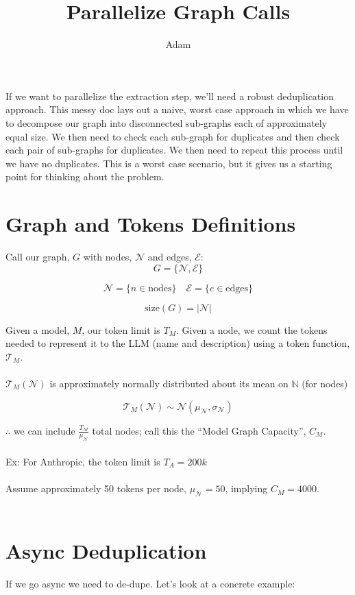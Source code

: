 \documentclass[11pt, oneside]{article}
\title{Parallelize Graph Calls}
\author{Adam}
\begin{document}
\maketitle
If we want to parallelize the extraction step, we'll need a robust deduplication approach. This messy doc lays out a naive, worst case approach in which we have to decompose our graph into disconnected sub-graphs each of approximately equal size. We then need to check each sub-graph for duplicates and then check each pair of sub-graphs for duplicates. We then need to repeat this process until we have no duplicates. This is a worst case scenario, but it gives us a starting point for thinking about the problem.

\section{Graph and Tokens Definitions}
Call our graph, $G$ with nodes, $\mathcal{N}$ and edges, $\mathcal{E}$:
\[ G = \{ \mathcal{N}, \mathcal{E} \} \]

\[ \mathcal{N} = \{n \in \text{nodes} \} \quad \mathcal{E} = \{ e \in \text{edges} \} \]

\[ \text{size}(G) = |\mathcal{N}| \]

Given a model, $M$, our token limit is $T_M$. Given a node, we count the tokens needed to represent it to the LLM (name and description) using a token function, $\mathcal{T}_M$.
\\
\\
\(\mathcal{T}_M(\mathcal{N})\) is approximately normally distributed about its mean on $\mathbb{N}$ (for nodes)

\[ \mathcal{T}_M(\mathcal{N}) \sim \mathcal{N}(\mu_\mathcal{N}, \sigma_\mathcal{N}) \]

$\therefore$ we can include \(\frac{T_M}{\mu_\mathcal{N}}\) total nodes; call this the ``Model Graph Capacity'', $C_M$.
\\
\\
Ex: For Anthropic, the token limit is \( T_A = 200k \)
\\
\\
Assume approximately 50 tokens per node, \( \mu_\mathcal{N} = 50 \), implying \( C_M = 4000 \).
\\
\\
\section{Async Deduplication}
If we go async we need to de-dupe. Let's look at a concrete example:
\end{document}
